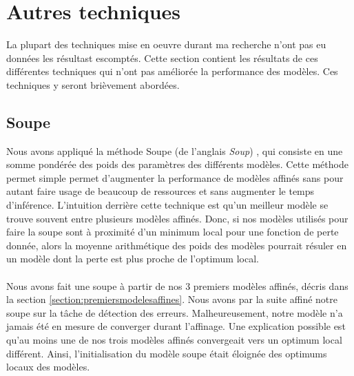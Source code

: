 \documentclass[12pt,twoside,maitrise]{dms}
\theoremstyle{definition}
\numberwithin{equation}{section}
\numberwithin{table}{chapter}
\numberwithin{figure}{chapter}
\begin{document}
\chapter{Autres techniques} \label{chapitre:autretechnique}
La plupart des techniques mise en oeuvre durant ma recherche n'ont pas eu
données les résultast escomptés. Cette section contient les résultats de ces
différentes techniques qui n'ont pas améliorée la performance des modèles. Ces
techniques y seront brièvement abordées.
\section{Soupe}
Nous avons appliqué la méthode Soupe (de l'anglais \textit{Soup}) \cite{soup},
qui consiste en une somme pondérée des poids des paramètres des différents
modèles. Cette méthode permet simple permet d'augmenter la performance de
modèles affinés sans pour autant faire usage de beaucoup de ressources et sans
augmenter le temps d'inférence. L'intuition derrière cette technique est qu'un
meilleur modèle se trouve souvent entre plusieurs modèles affinés. Donc, si nos
modèles utilisés pour faire la soupe sont à proximité d'un minimum local pour
une fonction de perte donnée, alors la moyenne arithmétique des poids des
modèles pourrait résuler en un modèle dont la perte est plus proche de l'optimum
local.\\
\\
Nous avons fait une soupe à partir de nos 3 premiers modèles affinés, décris dans
la section \ref{section:premiersmodelesaffines}. Nous avons par la suite affiné
notre soupe sur la tâche de détection des erreurs. Malheureusement, notre modèle
n'a jamais été en mesure de converger durant l'affinage. Une explication
possible est qu'au moins une de nos trois modèles affinés convergeait vers un
optimum local différent. Ainsi, l'initialisation du modèle soupe était éloignée
des optimums locaux des modèles.
\end{document}

